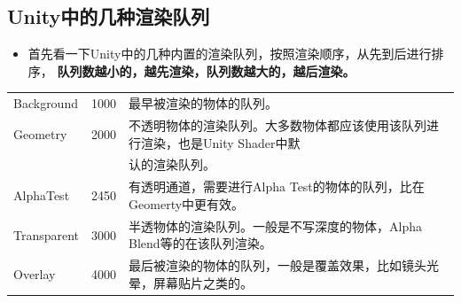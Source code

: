 \documentclass[9pt, b5paper]{article}
\begin{document}
\subsection{Unity中的几种渲染队列}
\label{sec-2-2}
\begin{itemize}
\item 首先看一下Unity中的几种内置的渲染队列，按照渲染顺序，从先到后进行排序， \textbf{队列数越小的，越先渲染，队列数越大的，越后渲染。}
\end{itemize}
\begin{center}
\begin{tabular}{lrl}
\hline
Background & 1000 & 最早被渲染的物体的队列。\\
Geometry & 2000 & 不透明物体的渲染队列。大多数物体都应该使用该队列进行渲染，也是Unity Shader中默\\
 &  & 认的渲染队列。\\
AlphaTest & 2450 & 有透明通道，需要进行Alpha Test的物体的队列，比在Geomerty中更有效。\\
Transparent & 3000 & 半透物体的渲染队列。一般是不写深度的物体，Alpha Blend等的在该队列渲染。\\
Overlay & 4000 & 最后被渲染的物体的队列，一般是覆盖效果，比如镜头光晕，屏幕贴片之类的。\\
\hline
\end{tabular}
\end{center}
\end{document}
